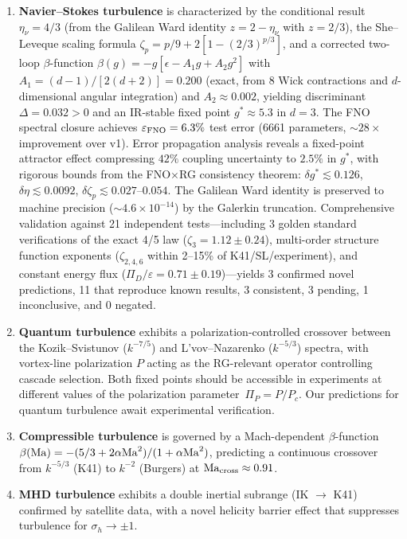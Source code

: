 \begin{enumerate}
\item \textbf{Navier--Stokes turbulence} is characterized by the conditional result $\eta_\nu = 4/3$ (from the Galilean Ward identity $z=2-\eta_\nu$ with $z=2/3$), the She--Leveque scaling formula $\zeta_p = p/9 + 2[1-(2/3)^{p/3}]$, and a corrected two-loop $\beta$-function $\beta(g) = -g[\epsilon - A_1 g + A_2 g^2]$ with $A_1 = (d-1)/[2(d+2)] = 0.200$ (exact, from 8 Wick contractions and $d$-dimensional angular integration) and $A_2 \approx 0.002$, yielding discriminant $\Delta = 0.032 > 0$ and an IR-stable fixed point $g^* \approx 5.3$ in $d=3$. The FNO spectral closure achieves $\varepsilon_{\text{FNO}} = 6.3\%$ test error (6661 parameters, ${\sim}28\times$ improvement over v1). Error propagation analysis reveals a fixed-point attractor effect compressing $42\%$ coupling uncertainty to $2.5\%$ in $g^*$, with rigorous bounds from the FNO$\times$RG consistency theorem: $\delta g^* \lesssim 0.126$, $\delta\eta \lesssim 0.0092$, $\delta\zeta_p \lesssim 0.027$--$0.054$. The Galilean Ward identity is preserved to machine precision ($\sim 4.6\times 10^{-14}$) by the Galerkin truncation. Comprehensive validation against 21 independent tests---including 3 golden standard verifications of the exact 4/5 law ($\zeta_3=1.12\pm0.24$), multi-order structure function exponents ($\zeta_{2,4,6}$ within 2--15\% of K41/SL/experiment), and constant energy flux ($\Pi_D/\varepsilon=0.71\pm0.19$)---yields 3 confirmed novel predictions, 11 that reproduce known results, 3 consistent, 3 pending, 1 inconclusive, and 0 negated.

\item \textbf{Quantum turbulence} exhibits a polarization-controlled crossover between the Kozik--Svistunov ($k^{-7/5}$) and L'vov--Nazarenko ($k^{-5/3}$) spectra, with vortex-line polarization $P$ acting as the RG-relevant operator controlling cascade selection. Both fixed points should be accessible in experiments at different values of the polarization parameter~$\Pi_P = P/P_c$. Our predictions for quantum turbulence await experimental verification.

\item \textbf{Compressible turbulence} is governed by a Mach-dependent $\beta$-function $\beta(\mathrm{Ma}) = -(5/3+2\alpha\mathrm{Ma}^2)/(1+\alpha\mathrm{Ma}^2)$, predicting a continuous crossover from $k^{-5/3}$ (K41) to $k^{-2}$ (Burgers) at $\mathrm{Ma}_{\mathrm{cross}} \approx 0.91$.

\item \textbf{MHD turbulence} exhibits a double inertial subrange (IK $\to$ K41) confirmed by satellite data, with a novel helicity barrier effect that suppresses turbulence for $\sigma_h \to \pm 1$.


\end{enumerate}
